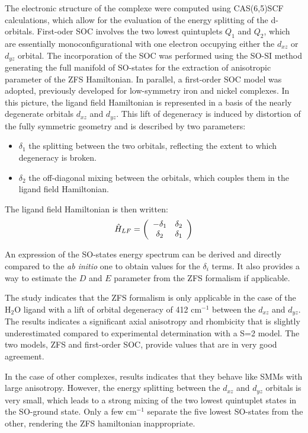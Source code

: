 \documentclass[12pt]{report}
\numberwithin{equation}{section}
\begin{document}
The electronic structure of the complexe were computed using CAS(6,5)SCF calculations, which allow for the evaluation of the energy splitting of the d-orbitals.
First-oder SOC involves the two lowest quintuplets $Q_1$ and $Q_2$, which are essentially monoconfigurational with one electron occupying either the $d_{xz}$ or $d_{yz}$ orbital.
The incorporation of the SOC was performed using the SO-SI method generating the full manifold of SO-states for the extraction of anisotropic parameter of the ZFS Hamiltonian.
In parallel, a first-order SOC model was adopted, previously developed for low-symmetry iron and nickel complexes.
In this picture, the ligand field Hamiltonian is represented in a basis of the nearly degenerate orbitals $d_{xz}$ and $d_{yz}$.
This lift of degeneracy is induced by distortion of the fully symmetric geometry and is described by two parameters:

\begin{itemize}
    \item $\delta_1$ the splitting between the two orbitals, reflecting the extent to which degeneracy is broken.
    \item $\delta_2$ the off-diagonal mixing between the orbitals, which couples them in the ligand field Hamiltonian.
\end{itemize}

The ligand field Hamiltonian is then written:
\[ \hat{H}_{LF}= \left( \begin{array}{c c}
    -\delta_1 & \delta_2 \\
    \delta_2& \delta_1
    \end{array} \right)
\]

An expression of the SO-states energy spectrum can be derived and directly compared to the \textit{ab initio} one to obtain values for the $\delta_i$ terms.
It also provides a way to estimate the $D$ and $E$ parameter from the ZFS formalism if applicable.


The study indicates that the ZFS formalism is only applicable in the case of the H$_2$O ligand with a lift of orbital degeneracy of 412 cm$^{-1}$ between the $d_{xz}$ and $d_{yz}$.
The results indicates a significant axial anisotropy and rhombicity that is slightly underestimated compared to experimental determination with a S=2 model.
The two models, ZFS and first-order SOC, provide values that are in very good agreement.

In the case of other complexes, results indicates that they behave like SMMs with large anisotropy.
However, the energy splitting between the $d_{xz}$ and $d_{yz}$ orbitals is very small, which leads to a strong mixing of the two lowest quintuplet states in the SO-ground state.
Only a few cm$^{-1}$ separate the five lowest SO-states from the other, rendering the ZFS hamiltonian inappropriate.
\end{document}
